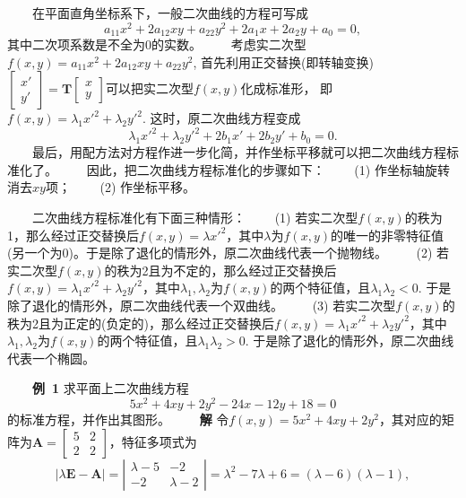 \documentclass[compress,mathserif,cjk]{beamer}
\theoremstyle{remark}
\numberwithin{equation}{section}
\newcommand{\hei}{\bf}      %
\begin{document}
\begin{CJK}{UTF8}{gbsn}
\begin{frame}
\end{frame}
\begin{frame}
\ \ \ \ 在平面直角坐标系下，一般二次曲线的方程可写成
$$a_{11}x^2+2a_{12}xy+a_{22}y^2+2a_1x+2a_2y+a_0=0,$$
其中二次项系数是不全为0的实数。
\vskip 5pt
\ \ \ \ 考虑实二次型$f(x,y)=a_{11}x^2+2a_{12}xy+a_{22}y^2$, 首先利用正交替换(即转轴变换)$\left[\begin{matrix}x'\\y'\end{matrix}\right]=\bm T\left[\begin{matrix}x\\y\end{matrix}\right]$可以把实二次型$f(x,y)$化成标准形，
\pause 即
$f(x,y)=\lambda_1x'^2+\lambda_2y'^2.$
这时，原二次曲线方程变成
$$\lambda_1x'^2+\lambda_2y'^2+2b_1x'+2b_2y'+b_0=0.$$
\ \ \ \ 最后，用配方法对方程作进一步化简，并作坐标平移就可以把二次曲线方程标准化了。
\pause\vskip 5pt
\ \ \ \ 因此，把二次曲线方程标准化的步骤如下：
\vskip 5pt
\ \ \ \ (1) 作坐标轴旋转消去$xy$项；
\vskip 5pt
\ \ \ \ (2) 作坐标平移。
\end{frame}
\begin{frame}
\ \ \ \ 二次曲线方程标准化有下面三种情形：
\vskip 5pt
\ \ \ \ (1) 若实二次型$f(x,y)$的秩为1，那么经过正交替换后$f(x,y)=\lambda x'^2$，其中$\lambda$为$f(x,y)$的唯一的非零特征值(另一个为0)。于是除了退化的情形外，原二次曲线代表一个抛物线。
\pause\vskip 5pt
\ \ \ \ (2) 若实二次型$f(x,y)$的秩为2且为不定的，那么经过正交替换后$f(x,y)=\lambda_1x'^2+\lambda_2y'^2$，其中$\lambda_1,\lambda_2$为$f(x,y)$的两个特征值，且$\lambda_1\lambda_2<0$. 于是除了退化的情形外，原二次曲线代表一个双曲线。
\pause\vskip 5pt
\ \ \ \ (3) 若实二次型$f(x,y)$的秩为2且为正定的(负定的)，那么经过正交替换后$f(x,y)=\lambda_1x'^2+\lambda_2y'^2$，其中$\lambda_1,\lambda_2$为$f(x,y)$的两个特征值，且$\lambda_1\lambda_2>0$. 于是除了退化的情形外，原二次曲线代表一个椭圆。
\end{frame}
\begin{frame}\small
\ \ \ \ {\hei 例~1} 求平面上二次曲线方程
$$5x^2+4xy+2y^2-24x-12y+18=0$$
的标准方程，并作出其图形。
\pause\vskip 2pt
\ \ \ \ {\hei 解} 令$f(x,y)=5x^2+4xy+2y^2$，其对应的矩阵为$\bm A=\left[\begin{matrix}5&2\\2&2\end{matrix}\right]$，特征多项式为
$$|\lambda\bm E-\bm A|=\left|\begin{matrix}\lambda-5&-2\\-2&\lambda-2\end{matrix}\right|=\lambda^2-7\lambda+6=(\lambda-6)(\lambda-1),$$

\end{frame}
\end{CJK}
\end{document}
